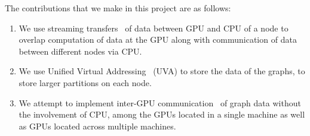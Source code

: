 The contributions that we make in this project are as follows:
\begin{enumerate}
\item We use streaming transfers~\cite{async-cuda} of data between GPU and CPU of a node to overlap computation of data at the GPU along with communication of data between different nodes via CPU. 
\item We use Unified Virtual Addressing~\cite{uva-cuda} (UVA) to store the data of the graphs, to store larger partitions on each node. 
\item We attempt to implement inter-GPU communication~\cite{rdma-cuda} of graph data without the involvement of CPU, among the GPUs located in a single machine as well as GPUs located across multiple machines. 
\end{enumerate}

